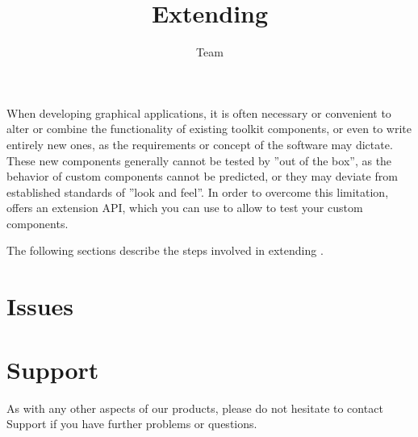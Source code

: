 
%
\title{Extending \app{}}
\author*{\app{} Team}{}
\maketitle

\setcounter{tocdepth}{2}
\tableofcontents
\renewcommand{\bxcomment}[2]{}%
\clearpage

\setcounter{secnumdepth}{2}

When developing graphical applications, it is often necessary or
convenient to alter or combine the functionality of existing toolkit
components, or even to write entirely new ones, as the requirements or
concept of the software may dictate. These new components
generally cannot be tested by \app{} ''out of the box'', as the
behavior of custom components cannot be predicted, or they may deviate
from established standards of ''look and feel''. In order to overcome this limitation, \app{} offers an extension
API, which you can use to allow \app{} to test your custom components.

The following sections describe the steps involved in extending
\app{}.

\clearpage



\clearpage

\chapter{Issues}


\clearpage
\chapter{Support}

As with any other aspects of our products, please do not hesitate to
contact \app{} Support if you have further problems or questions.

\clearpage
